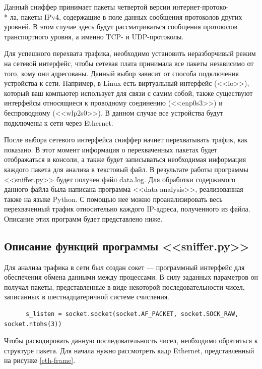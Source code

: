 \documentclass[bachelor, och, coursework]{SCWorks}
\begin{document}
  Данный сниффер принимает пакеты четвертой версии интернет-протоко- \\* ла, пакеты IPv4, содержащие в поле данных сообщения протоколов
  других уровней. В этом случае здесь будут рассматриваться сообщения протоколов транспортного уровня, а именно TCP- и UDP-протоколы.
    
  Для успешного перехвата трафика, необходимо установить неразборчивый режим на сетевой интерфейс, чтобы сетевая плата принимала
  все пакеты независимо от того, кому они адресованы. Данный выбор зависит от способа подключения устройства к сети. Например, в Linux
  есть виртуальный интерфейс (<<lo>>), который ваш компьютер использует для связи с самим собой, также существуют интерфейсы относящиеся
  к проводному соединению (<<enp0s3>>) и беспроводному (<<wlp2s0>>). В данном случае все устройства будут подключены к сети через Ethernet.
  
  После выбора сетевого интерфейса сниффер начнет перехватывать трафик, как показано. В этот момент информация о перехваченных пакетах будет отображаться
  в консоли, а также будет записываться необходимая информация каждого пакета для анализа в текстовый файл.
  В результате работы программы <<sniffer.py>> будет получен файл data.log. Для обработки содержимого данного файла была написана программа
  <<data-analysis>>, реализованная также на языке Python. С помощью нее можно проанализировать весь перехваченный трафик относительно каждого
  IP-адреса, полученного из файла. Описание этих программ будет представлено ниже. 

  \subsection{Описание функций программы <<sniffer.py>>}

    Для анализа трафика в сети был создан сокет --- программный интерфейс для обеспечения обмена данными между процессами. В силу заданных параметров он
    получал пакеты, представленные в виде некоторой последовательности чисел, записанных в шестнадцатеричной системе счисления.
    
    \begin{verbatim}
      s_listen = socket.socket(socket.AF_PACKET, socket.SOCK_RAW, socket.ntohs(3))
    \end{verbatim}
    
    Чтобы раскодировать данную последовательность чисел, необходимо обратиться к структуре пакета. Для начала нужно рассмотреть кадр Ethernet, представленный
    на рисунке \ref{eth-frame}.
    
\end{document}
